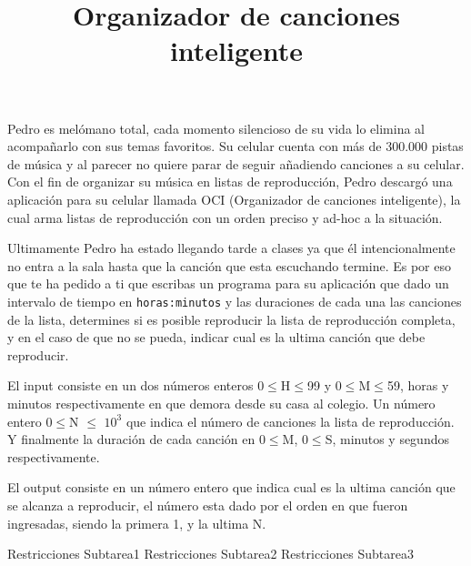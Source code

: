 \documentclass{oci}
\title{Organizador de canciones inteligente}
\begin{document}
\begin{problemDescription}
Pedro es melómano total, cada momento silencioso de su vida lo elimina
al acompañarlo con sus temas favoritos. Su celular cuenta con más de
300.000 pistas de música y al parecer no quiere parar de seguir
añadiendo canciones a su celular. Con el fin de organizar su música en
listas de reproducción, Pedro descargó una aplicación para su celular
llamada OCI (Organizador de canciones inteligente), la cual arma listas
de reproducción con un orden preciso y ad-hoc a la situación.

Ultimamente Pedro ha estado llegando tarde a clases ya que él
intencionalmente no entra a la sala hasta que la canción que esta
escuchando termine. Es por eso que te ha pedido a ti que escribas un
programa para su aplicación que dado un intervalo de tiempo en
\texttt{horas:minutos} y las duraciones de cada una las canciones de la
lista, determines si es posible reproducir la lista de reproducción
completa, y en el caso de que no se pueda, indicar cual es la ultima
canción que debe reproducir.
\end{problemDescription}

\begin{inputDescription}
El input consiste en un dos números enteros 0\(\leq\)H\(\leq\)99 y
0\(\leq\)M\(\leq\)59, horas y minutos respectivamente en que demora
desde su casa al colegio. Un número entero 0\(\leq\)N \(\leq\) \(10^3\)
que indica el número de canciones la lista de reproducción. Y finalmente
la duración de cada canción en 0\(\leq\)M,
0\(\leq\)S, minutos y segundos respectivamente.
\end{inputDescription}

\begin{outputDescription}
El output consiste en un número entero que indica cual
es la ultima canción que se alcanza a reproducir, el número esta dado por el
orden en que fueron ingresadas, siendo la primera 1, y la ultima N.
\end{outputDescription}

\begin{scoreDescription}
   Restricciones Subtarea1
   Restricciones Subtarea2
   Restricciones Subtarea3
\end{scoreDescription}

\begin{sampleDescription}
\end{sampleDescription}
\end{document}
